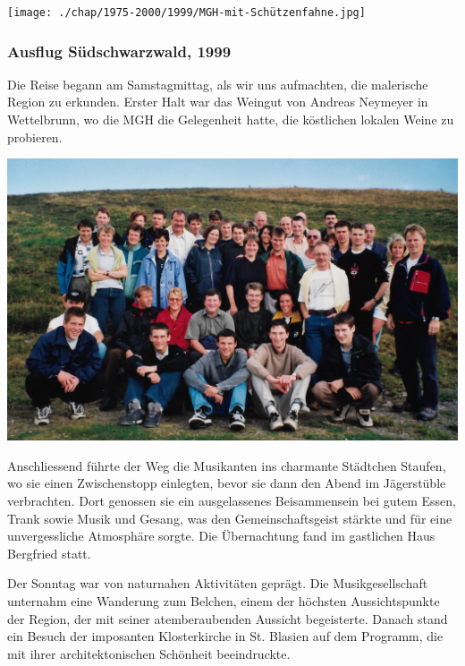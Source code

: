 \begin{history}
    \begin{MulticolFigure}
        \centering
        \texttt{[image: ./chap/1975-2000/1999/MGH-mit-Schützenfahne.jpg]}
    \end{MulticolFigure}

    \subsubsection{Ausflug Südschwarzwald, 1999}

    Die Reise begann am Samstagmittag, als wir uns aufmachten, die malerische
    Region zu erkunden. Erster Halt war das Weingut von Andreas Neymeyer in
    Wettelbrunn, wo die MGH die Gelegenheit hatte, die köstlichen lokalen Weine
    zu probieren.

    \begin{MulticolFigure}
        \centering
        \includegraphics[width=0.9\linewidth]{./chap/1975-2000/1999/MGH-Ausflug-Schwarzwald-1999.jpg}
    \end{MulticolFigure}

    Anschliessend führte der Weg die Musikanten ins charmante Städtchen Staufen,
    wo sie einen Zwischenstopp einlegten, bevor sie dann den Abend im
    Jägerstüble verbrachten. Dort genossen sie ein ausgelassenes Beisammensein
    bei gutem Essen, Trank sowie Musik und Gesang, was den Gemeinschaftsgeist
    stärkte und für eine unvergessliche Atmosphäre sorgte. Die Übernachtung fand
    im gastlichen Haus Bergfried statt.

    Der Sonntag war von naturnahen Aktivitäten geprägt. Die Musikgesellschaft
    unternahm eine Wanderung zum Belchen, einem der höchsten Aussichtspunkte der
    Region, der mit seiner atemberaubenden Aussicht begeisterte. Danach stand
    ein Besuch der imposanten Klosterkirche in St. Blasien auf dem Programm, die
    mit ihrer architektonischen Schönheit beeindruckte.


\end{history}
